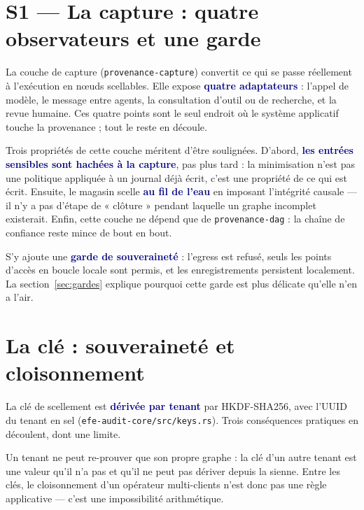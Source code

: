 \documentclass[10pt]{article}
\newcommand{\code}[1]{\texttt{\small #1}}
\newcommand{\mm}[1]{\textbf{\textcolor{navy}{#1}}}
\begin{document}
\section{S1 — La capture : quatre observateurs et une garde}

La couche de capture (\code{provenance-capture}) convertit ce qui se passe réellement à l'exécution en nœuds scellables. Elle expose \mm{quatre adaptateurs} : l'appel de modèle, le message entre agents, la consultation d'outil ou de recherche, et la revue humaine. Ces quatre points sont le seul endroit où le système applicatif touche la provenance ; tout le reste en découle.

Trois propriétés de cette couche méritent d'être soulignées. D'abord, \mm{les entrées sensibles sont hachées à la capture}, pas plus tard : la minimisation n'est pas une politique appliquée à un journal déjà écrit, c'est une propriété de ce qui est écrit. Ensuite, le magasin scelle \mm{au fil de l'eau} en imposant l'intégrité causale — il n'y a pas d'étape de « clôture » pendant laquelle un graphe incomplet existerait. Enfin, cette couche ne dépend que de \code{provenance-dag} : la chaîne de confiance reste mince de bout en bout.

S'y ajoute une \mm{garde de souveraineté} : l'egress est refusé, seuls les points d'accès en boucle locale sont permis, et les enregistrements persistent localement. La section~\ref{sec:gardes} explique pourquoi cette garde est plus délicate qu'elle n'en a l'air.

\section{La clé : souveraineté et cloisonnement}

La clé de scellement est \mm{dérivée par tenant} par HKDF-SHA256, avec l'UUID du tenant en sel (\code{efe-audit-core/\allowbreak src/\allowbreak keys.rs}). Trois conséquences pratiques en découlent, dont une limite.

Un tenant ne peut re-prouver que son propre graphe : la clé d'un autre tenant est une valeur qu'il n'a pas et qu'il ne peut pas dériver depuis la sienne. Entre les clés, le cloisonnement d'un opérateur multi-clients n'est donc pas une règle applicative — c'est une impossibilité arithmétique.
\end{document}

